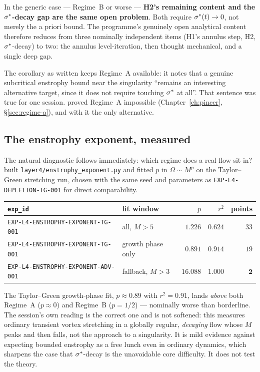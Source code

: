 \begin{statement}
\label{st:unification}
In the generic case --- Regime~B or worse --- \textbf{H2's remaining content
and the \(\sigma^{*}\)-decay gap are the same open problem}. Both require
\(\sigma^{*}(t)\to0\), not merely the a priori bound. The programme's genuinely
open analytical content therefore reduces from three nominally independent
items (H1's annulus step, H2, \(\sigma^{*}\)-decay) to two: the annulus
level-iteration, then thought mechanical, and a single deep gap.
\end{statement}

The corollary as written keeps Regime~A available: it notes that a genuine
subcritical enstrophy bound near the singularity ``remains an interesting
alternative target, since it does not require touching \(\sigma^{*}\) at all''.
That sentence was true for one session.  proved Regime~A impossible
(Chapter~\ref{ch:pincer}, \S\ref{sec:regime-a}), and with it the only
alternative.

\subsection{The enstrophy exponent, measured}

The natural diagnostic follows immediately: which regime does a real flow sit
in?  built \texttt{layer4/enstrophy\_exponent.py} and fitted \(p\) in
\(\Omega\sim M^p\) on the Taylor--Green stretching run, chosen with the same
seed and parameters as \texttt{EXP-L4-DEPLETION-TG-001} for direct
comparability.

\begin{center}
\small
\begin{tabular}{@{}l l r r r@{}}
\toprule
\texttt{exp\_id} & fit window & \(p\) & \(r^2\) & points \\
\midrule
\texttt{EXP-L4-ENSTROPHY-EXPONENT-TG-001} & all, \(M>5\) & \(1.226\) & \(0.624\) & \(33\) \\
\texttt{EXP-L4-ENSTROPHY-EXPONENT-TG-001} & growth phase only & \(\mathbf{0.891}\) & \(\mathbf{0.914}\) & \(19\) \\
\texttt{EXP-L4-ENSTROPHY-EXPONENT-ADV-001} & fallback, \(M>3\) & \(16.088\) & \(1.000\) & \(\mathbf{2}\) \\
\bottomrule
\end{tabular}
\end{center}

\medskip
The Taylor--Green growth-phase fit, \(p\approx0.89\) with \(r^2=0.91\), lands
\emph{above} both Regime~A (\(p\approx0\)) and Regime~B (\(p=1/2\)) ---
nominally worse than borderline. The session's own reading is the correct one
and is not softened: this measures ordinary transient vortex stretching in a
globally regular, \emph{decaying} flow whose \(M\) peaks and then falls, not
the approach to a singularity. It is mild evidence against expecting bounded
enstrophy as a free lunch even in ordinary dynamics, which sharpens the case
that \(\sigma^{*}\)-decay is the unavoidable core difficulty. It does not test the
theory.

